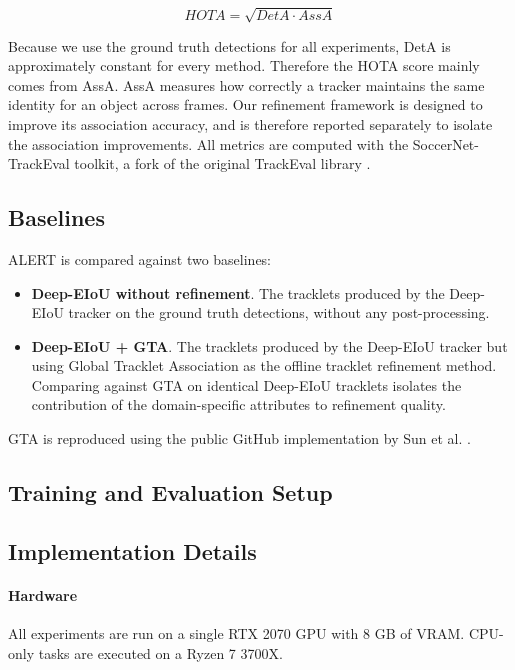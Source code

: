 \begin{equation}
    HOTA = \sqrt{DetA \cdot AssA}
\end{equation}

Because we use the ground truth detections for all experiments, DetA is approximately constant for every method. Therefore the HOTA score mainly comes from AssA. AssA measures how correctly a tracker maintains the same identity for an object across frames. Our refinement framework is designed to improve its association accuracy, and is therefore reported separately to isolate the association improvements. All metrics are computed with the SoccerNet-TrackEval toolkit, a fork of the original TrackEval library \cite{trackeval}.

\subsection{Baselines}\label{sec:baselines}
ALERT is compared against two baselines:

\begin{itemize}
    \item \textbf{Deep-EIoU without refinement}. The tracklets produced by the Deep-EIoU tracker on the ground truth detections, without any post-processing.

    \item \textbf{Deep-EIoU + GTA}. The tracklets produced by the Deep-EIoU tracker but using Global Tracklet Association as the offline tracklet refinement method. Comparing against GTA on identical Deep-EIoU tracklets isolates the contribution of the domain-specific attributes to refinement quality.
\end{itemize}

GTA is reproduced using the public GitHub implementation by Sun et al. \cite{gta}.

\subsection{Training and Evaluation Setup}\label{sec:training_and_evaluation}


\subsection{Implementation Details}\label{sec:implementation_details}
\paragraph{Hardware}
All experiments are run on a single RTX 2070 GPU with 8 GB of VRAM. CPU-only tasks are executed on a Ryzen 7 3700X.


